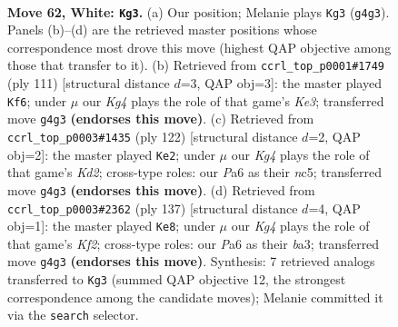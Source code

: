 \documentclass[11pt]{article}
\begin{document}
\clearpage

\begin{figure}[p]\centering
\begin{subfigure}{0.46\textwidth}\centering
\resizebox{\linewidth}{!}{%
\newchessgame
\chessboard[
  setfen={5r1k/4R3/P7/8/6K1/8/8/8 w - - 9 62},
  showmover=false,
  pgfstyle=straightmove, color=movearrow, markmove={g4-g3}
]}
\caption{}
\end{subfigure}\hfill
\begin{subfigure}{0.46\textwidth}\centering
\resizebox{\linewidth}{!}{%
\newchessgame
\chessboard[
  setfen={8/7p/4k2P/2r5/3R1K2/8/8/8 b - - 3 56},
  showmover=false,
  pgfstyle=straightmove, color=movearrow, markmove={e6-f6}
]}
\caption{}
\end{subfigure}
\\[4pt]
\begin{subfigure}{0.46\textwidth}\centering
\resizebox{\linewidth}{!}{%
\newchessgame
\chessboard[
  setfen={6R1/8/8/2n5/8/r6k/3K4/8 w - - 14 62},
  showmover=false,
  pgfstyle=straightmove, color=movearrow, markmove={d2-e2}
]}
\caption{}
\end{subfigure}\hfill
\begin{subfigure}{0.46\textwidth}\centering
\resizebox{\linewidth}{!}{%
\newchessgame
\chessboard[
  setfen={8/5k2/8/1r6/8/B7/5p2/K6R b - - 1 69},
  showmover=false,
  pgfstyle=straightmove, color=movearrow, markmove={f7-e8}
]}
\caption{}
\end{subfigure}
\caption{\textbf{Move 62, White: \texttt{Kg3}.} (a) Our position; Melanie plays \texttt{Kg3} (\texttt{g4g3}). Panels (b)--(d) are the retrieved master positions whose correspondence most drove this move (highest QAP objective among those that transfer to it). (b) Retrieved from \texttt{ccrl\_top\_p0001\#1749} (ply 111) [structural distance $d$=3, QAP obj=3]: the master played \texttt{Kf6}; under $\mu$ our \emph{Kg4} plays the role of that game's \emph{Ke3}; transferred move \texttt{g4g3} \textbf{(endorses this move)}. (c) Retrieved from \texttt{ccrl\_top\_p0003\#1435} (ply 122) [structural distance $d$=2, QAP obj=2]: the master played \texttt{Ke2}; under $\mu$ our \emph{Kg4} plays the role of that game's \emph{Kd2}; cross-type roles: our \emph{P}a6 as their \emph{n}c5; transferred move \texttt{g4g3} \textbf{(endorses this move)}. (d) Retrieved from \texttt{ccrl\_top\_p0003\#2362} (ply 137) [structural distance $d$=4, QAP obj=1]: the master played \texttt{Ke8}; under $\mu$ our \emph{Kg4} plays the role of that game's \emph{Kf2}; cross-type roles: our \emph{P}a6 as their \emph{b}a3; transferred move \texttt{g4g3} \textbf{(endorses this move)}. Synthesis: 7 retrieved analogs transferred to \texttt{Kg3} (summed QAP objective 12, the strongest correspondence among the candidate moves); Melanie committed it via the \texttt{search} selector.}
\label{fig:thought-m122}
\end{figure}
\end{document}
